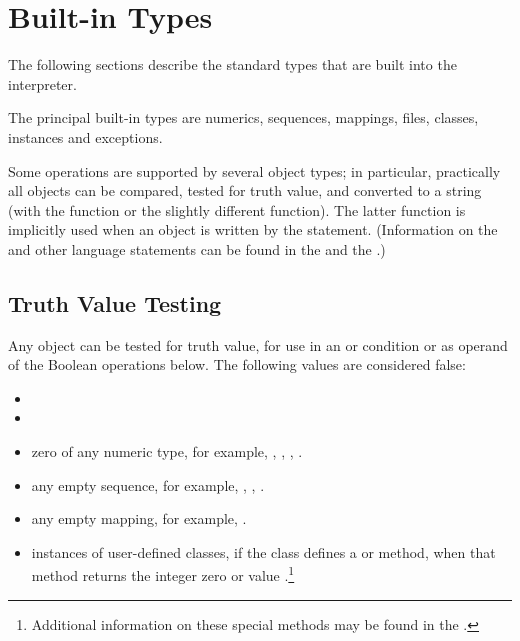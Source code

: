 \chapter{Built-in Types \label{types}}

The following sections describe the standard types that are built into
the interpreter.

The principal built-in types are numerics, sequences, mappings, files,
classes, instances and exceptions.

Some operations are supported by several object types; in particular,
practically all objects can be compared, tested for truth value,
and converted to a string (with
the  function or the slightly different
 function).  The latter
function is implicitly used when an object is written by the
 statement.
(Information on the 
and other language statements can be found in the
 and the
.)


\section{Truth Value Testing\label{truth}}

Any object can be tested for truth value, for use in an  or
 condition or as operand of the Boolean operations below.
The following values are considered false:

\begin{itemize}

\item	{}

\item	{}

\item	zero of any numeric type, for example, , ,
        , .

\item	any empty sequence, for example, , \code{()}, \code{[]}.

\item	any empty mapping, for example, \code{\{\}}.

\item	instances of user-defined classes, if the class defines a
         or  method, when that
        method returns the integer zero or  value
        .\footnote{Additional 
information on these special methods may be found in the
.}

\end{itemize}

